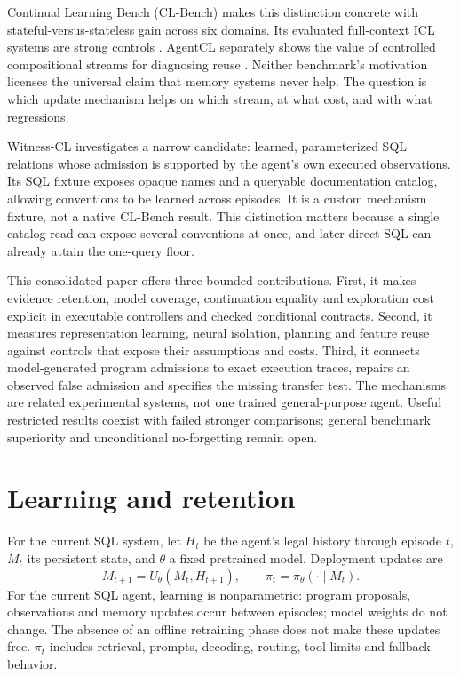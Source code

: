 \documentclass[10pt,twocolumn]{article}
\begin{document}
Continual Learning Bench (CL-Bench) makes this distinction concrete with
stateful-versus-stateless gain across six domains. Its evaluated full-context
ICL systems are strong controls \citep{asawa2026clbench}. AgentCL separately
shows the value of controlled compositional streams for diagnosing reuse
\citep{shu2026agentcl}. Neither benchmark's motivation licenses the universal
claim that memory systems never help. The question is which update mechanism
helps on which stream, at what cost, and with what regressions.

Witness-CL investigates a narrow candidate: learned, parameterized SQL
relations whose admission is supported by the agent's own executed observations.
Its SQL fixture exposes opaque names and a queryable documentation catalog,
allowing conventions to be learned across episodes. It is a custom mechanism
fixture, not a native CL-Bench result. This distinction matters because a single
catalog read can expose several conventions at once, and later direct SQL can
already attain the one-query floor.

This consolidated paper offers three bounded contributions. First, it makes
evidence retention, model coverage, continuation equality and exploration cost
explicit in executable controllers and checked conditional contracts. Second, it
measures representation learning, neural isolation, planning and feature reuse
against controls that expose their assumptions and costs. Third, it connects
model-generated program admissions to exact execution traces, repairs an
observed false admission and specifies the missing transfer test. The mechanisms
are related experimental systems, not one trained general-purpose agent. Useful
restricted results coexist with failed stronger comparisons; general benchmark
superiority and unconditional no-forgetting remain open.

\section{Learning and retention}
For the current SQL system, let $H_t$ be the agent's legal history through
episode $t$, $M_t$ its persistent state, and $\theta$ a fixed pretrained model.
Deployment updates are
\begin{equation}
 M_{t+1}=U_\theta(M_t,H_{t+1}),\qquad
 \pi_t=\pi_\theta(\cdot\mid M_t).
\end{equation}
For the current SQL agent, learning is nonparametric: program proposals, observations and memory
updates occur between episodes; model weights do not change. The absence of an
offline retraining phase does not make these updates free. $\pi_t$ includes
retrieval, prompts, decoding, routing, tool limits and fallback behavior.
\end{document}

